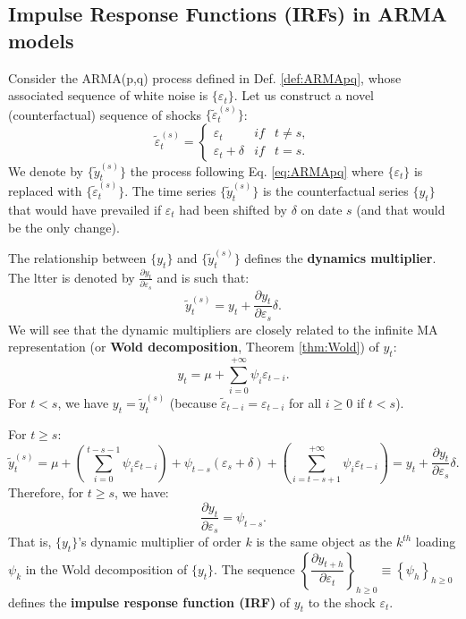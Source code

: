 \documentclass[
  12pt,
]{book}
\theoremstyle{definition}
\theoremstyle{definition}
\theoremstyle{definition}
\theoremstyle{definition}
\theoremstyle{remark}
\begin{document}
\hypertarget{impulse-response-functions-irfs-in-arma-models}{%
\subsection{Impulse Response Functions (IRFs) in ARMA models}\label{impulse-response-functions-irfs-in-arma-models}}

Consider the ARMA(p,q) process defined in Def. \ref{def:ARMApq}, whose associated sequence of white noise is \(\{\varepsilon_t\}\). Let us construct a novel (counterfactual) sequence of shocks \(\{\tilde\varepsilon_t^{(s)}\}\):
\[
\tilde\varepsilon_t^{(s)} = \left\{
\begin{array}{lcc}
\varepsilon_{t} & if & t \ne s,\\
\varepsilon_{t} + \delta &if& t=s.
\end{array}
\right.
\]
We denote by \(\{\tilde{y}_t^{(s)}\}\) the process following Eq. \eqref{eq:ARMApq} where \(\{\varepsilon_t\}\) is replaced with \(\{\tilde\varepsilon_t^{(s)}\}\). The time series \(\{\tilde{y}_t^{(s)}\}\) is the counterfactual series \(\{y_t\}\) that would have prevailed if \(\varepsilon_t\) had been shifted by \(\delta\) on date \(s\) (and that would be the only change).

The relationship between \(\{y_t\}\) and \(\{\tilde{y}_t^{(s)}\}\) defines the \textbf{dynamics multiplier}. The ltter is denoted by \(\frac{\partial y_t}{\partial \varepsilon_{s}}\) and is such that:
\[
\tilde{y}_t^{(s)} = y_t + \frac{\partial y_t}{\partial \varepsilon_{s}}\delta.
\]
We will see that the dynamic multipliers are closely related to the infinite MA representation (or \textbf{Wold decomposition}, Theorem \ref{thm:Wold}) of \(y_t\):
\[
y_t = \mu + \sum_{i=0}^{+\infty} \psi_i \varepsilon_{t-i}.
\]
For \(t<s\), we have \(y_t = \tilde{y}_t^{(s)}\) (because \(\tilde{\varepsilon}_{t-i}= \varepsilon_{t-i}\) for all \(i \ge 0\) if \(t<s\)).

For \(t \ge s\):
\[
\tilde{y}_t^{(s)} = \mu + \left( \sum_{i=0}^{t-s-1} \psi_i \varepsilon_{t-i} \right) + \psi_{t-s}(\varepsilon_{s}+\delta) + \left( \sum_{i=t-s+1}^{+\infty} \psi_i \varepsilon_{t-i} \right)=y_t + \frac{\partial y_t}{\partial \varepsilon_{s}}\delta.
\]
Therefore, for \(t \ge s\), we have:
\[
\boxed{\dfrac{\partial y_t}{\partial \varepsilon_{s}}=\psi_{t-s}.}
\]
That is, \(\{y_t\}\)'s dynamic multiplier of order \(k\) is the same object as the \(k^{th}\) loading \(\psi_k\) in the Wold decomposition of \(\{y_t\}\). The sequence \(\left\{\dfrac{\partial y_{t+h}}{\partial \varepsilon_{t}}\right\}_{h \ge 0} \equiv \left\{\psi_h\right\}_{h \ge 0}\) defines the \textbf{impulse response function (IRF)} of \(y_t\) to the shock \(\varepsilon_t\).
\end{document}
